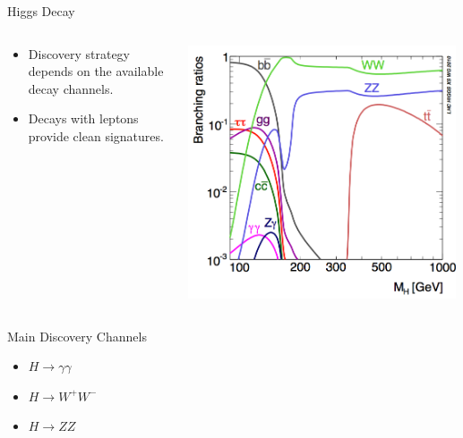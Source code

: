 \begin{frame}{Higgs Decay}
\begin{center}
\begin{columns}
  \begin{column}{0.5\textwidth}
    \begin{itemize}
      \item
        Discovery strategy depends on the available decay channels.
      \item
        Decays with leptons provide clean signatures.
    \end{itemize}
  \end{column}
  \begin{column}{0.5\textwidth}
    \includegraphics[width=0.99\textwidth]{images/branching_ratio.png}
  \end{column}
\end{columns}
Main Discovery Channels
\begin{itemize}
\item
  $H \rightarrow \gamma \gamma$
\item
  $H \rightarrow W^+W^-$
\item
  $H \rightarrow ZZ$
\end{itemize}
\end{center}
\end{frame}


